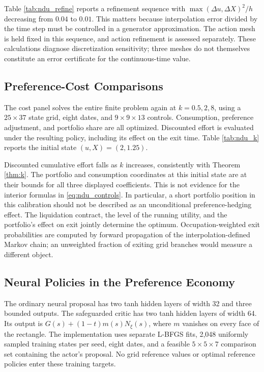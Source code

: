 Table \ref{tab:ndu_refine} reports a refinement sequence with $\max(\Delta u,\Delta X)^2/h$ decreasing from $0.04$ to $0.01$. This matters because interpolation error divided by the time step must be controlled in a generator approximation. The action mesh is held fixed in this sequence, and action refinement is assessed separately. These calculations diagnose discretization sensitivity; three meshes do not themselves constitute an error certificate for the continuous-time value.


\subsection{Preference-Cost Comparisons}
The cost panel solves the entire finite problem again at $k=0.5,2,8$, using a $25\times37$ state grid, eight dates, and $9\times9\times13$ controls. Consumption, preference adjustment, and portfolio share are all optimized. Discounted effort is evaluated under the resulting policy, including its effect on the exit time. Table \ref{tab:ndu_k} reports the initial state $(u,X)=(2,1.25)$.


Discounted cumulative effort falls as $k$ increases, consistently with Theorem \ref{thm:k}. The portfolio and consumption coordinates at this initial state are at their bounds for all three displayed coefficients. This is not evidence for the interior formulas in \eqref{eq:ndu_controls}. In particular, a short portfolio position in this calibration should not be described as an unconditional preference-hedging effect. The liquidation contract, the level of the running utility, and the portfolio's effect on exit jointly determine the optimum. Occupation-weighted exit probabilities are computed by forward propagation of the interpolation-defined Markov chain; an unweighted fraction of exiting grid branches would measure a different object.

\subsection{Neural Policies in the Preference Economy}
The ordinary neural proposal has two tanh hidden layers of width 32 and three bounded outputs. The safeguarded critic has two tanh hidden layers of width 64. Its output is $G(s)+(1-t)m(s)N_\xi(s)$, where $m$ vanishes on every face of the rectangle. The implementation uses separate L-BFGS fits, 2,048 uniformly sampled training states per seed, eight dates, and a feasible $5\times5\times7$ comparison set containing the actor's proposal. No grid reference values or optimal reference policies enter these training targets.


